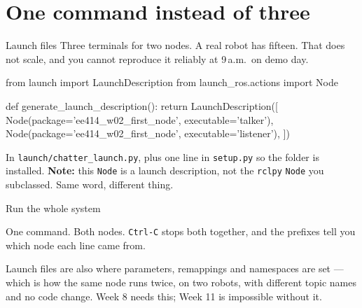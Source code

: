 \documentclass[aspectratio=169]{beamer}
\begin{document}
\section{One command instead of three}

\begin{frame}[fragile]{Launch files}
  \small
  Three terminals for two nodes. A real robot has fifteen. That does not scale, and you cannot
  reproduce it reliably at 9\,a.m.\ on demo day.

  \begin{pycodes}
from launch import LaunchDescription
from launch_ros.actions import Node

def generate_launch_description():
    return LaunchDescription([
        Node(package='ee414_w02_first_node', executable='talker'),
        Node(package='ee414_w02_first_node', executable='listener'),
    ])
  \end{pycodes}

  \vspace{0.3em}
  \footnotesize
  In \texttt{launch/chatter\_launch.py}, plus one line in \texttt{setup.py} so the folder is
  installed. \textbf{Note:} this \texttt{Node} is a launch description, not the
  \texttt{rclpy} \texttt{Node} you subclassed. Same word, different thing.
\end{frame}

\begin{frame}[fragile]{Run the whole system}

  \vspace{0.3em}
  \footnotesize
  One command. Both nodes. \texttt{Ctrl-C} stops both together, and the prefixes tell you
  which node each line came from.

  \begin{inthefield}
    \footnotesize
    Launch files are also where parameters, remappings and namespaces are set --- which is how
    the same node runs twice, on two robots, with different topic names and no code change.
    Week 8 needs this; Week 11 is impossible without it.
  \end{inthefield}
\end{frame}
\end{document}
